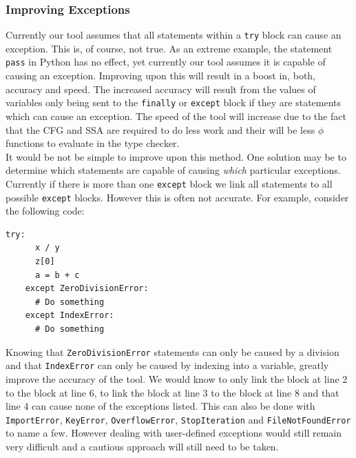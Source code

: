 \documentclass[12pt, titlepage]{article}
\begin{document}
\subsubsection*{Improving Exceptions}
Currently our tool assumes that all statements within a \texttt{try} block can cause an exception. This is, of course, not true. As an extreme example, the statement \texttt{pass} in Python has no effect, yet currently our tool assumes it is capable of causing an exception. Improving upon this will result in a boost in, both, accuracy and speed. The increased accuracy will result from the values of variables only being sent to the \texttt{finally} or \texttt{except} block if they are statements which can cause an exception. The speed of the tool will increase due to the fact that the CFG and SSA are required to do less work and their will be less $\phi$ functions to evaluate in the type checker. \\
\indent It would be not be simple to improve upon this method. One solution may be to determine which statements are capable of causing \textit{which} particular exceptions. Currently if there is more than one \texttt{except} block we link all statements to all possible \texttt{except} blocks. However this is often not accurate. For example, consider the following code:
\begin{lstlisting}[mathescape]
    try:
      x / y
      z[0]
      a = b + c
    except ZeroDivisionError:
      # Do something
    except IndexError:
      # Do something
\end{lstlisting}
Knowing that \texttt{ZeroDivisionError} statements can only be caused by a division and that \texttt{IndexError} can only be caused by indexing into a variable, greatly improve the accuracy of the tool. We would know to only link the block at line 2 to the block at line 6, to link the block at line 3 to the block at line 8 and that line 4 can cause none of the exceptions listed. This can also be done with \texttt{ImportError}, \texttt{KeyError}, \texttt{OverflowError}, \texttt{StopIteration} and \texttt{FileNotFoundError} to name a few. However dealing with user-defined exceptions would still remain very difficult and a cautious approach will still need to be taken.
\end{document}
